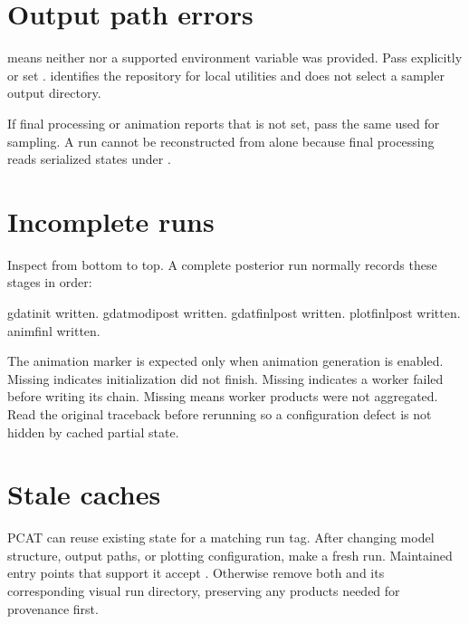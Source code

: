 \documentclass[letterpaper,10pt,english]{sphinxmanual}
\begin{document}
\section{Output path errors}
\label{\detokenize{troubleshooting:output-path-errors}}
\sphinxAtStartPar
{} means neither  nor a supported
environment variable was provided. Pass  explicitly or set
.  identifies the repository for local utilities
and does not select a sampler output directory.

\sphinxAtStartPar
If final processing or animation reports that  is not set,
pass the same  used for sampling. A run cannot be reconstructed from
 alone because final processing reads serialized states under
.


\section{Incomplete runs}
\label{\detokenize{troubleshooting:incomplete-runs}}
\sphinxAtStartPar
Inspect  from bottom to top. A complete posterior
run normally records these stages in order:

\begin{sphinxVerbatim}[commandchars=\\\{\}]
gdatinit written.
gdatmodipost written.
gdatfinlpost written.
plotfinlpost written.
animfinl written.
\end{sphinxVerbatim}

\sphinxAtStartPar
The animation marker is expected only when animation generation is enabled.
Missing  indicates initialization did not finish. Missing
 indicates a worker failed before writing its chain. Missing
 means worker products were not aggregated. Read the original
traceback before rerunning so a configuration defect is not hidden by cached
partial state.


\section{Stale caches}
\label{\detokenize{troubleshooting:stale-caches}}
\sphinxAtStartPar
PCAT can reuse existing state for a matching run tag. After changing model
structure, output paths, or plotting configuration, make a fresh run. Maintained
entry points that support it accept . Otherwise remove both
 and its corresponding visual run directory, preserving
any products needed for provenance first.
\end{document}
